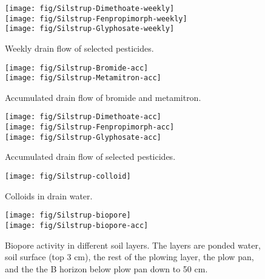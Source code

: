 \begin{figure}[htbp]
  \begin{center}
    \texttt{[image: fig/Silstrup-Dimethoate-weekly]}\\
    \texttt{[image: fig/Silstrup-Fenpropimorph-weekly]}\\
    \texttt{[image: fig/Silstrup-Glyphosate-weekly]}
  \end{center}
  \caption{Weekly drain flow of selected pesticides.}
  \label{fig:Silstrup-weekly2}
\end{figure}\FloatBarrier

\begin{figure}[htbp]
  \begin{center}
    \texttt{[image: fig/Silstrup-Bromide-acc]}\\
    \texttt{[image: fig/Silstrup-Metamitron-acc]}
  \end{center}
  \caption{Accumulated drain flow of bromide and metamitron.}
  \label{fig:Silstrup-bromide-acc}
\end{figure}\FloatBarrier

\begin{figure}[htbp]
  \begin{center}
    \texttt{[image: fig/Silstrup-Dimethoate-acc]}\\
    \texttt{[image: fig/Silstrup-Fenpropimorph-acc]}\\
    \texttt{[image: fig/Silstrup-Glyphosate-acc]}
  \end{center}
  \caption{Accumulated drain flow of selected pesticides.}
  \label{fig:Silstrup-acc}
\end{figure}\FloatBarrier

\begin{figure}[htbp]
  \begin{center}
    \texttt{[image: fig/Silstrup-colloid]}
  \end{center}
  \caption{Colloids in drain water.}
  \label{fig:Silstrup-colloids}
\end{figure}\FloatBarrier

\begin{figure}[htbp]
  \begin{center}
    \texttt{[image: fig/Silstrup-biopore]}\\
    \texttt{[image: fig/Silstrup-biopore-acc]}\\
  \end{center}
  \caption{Biopore activity in different soil layers.  The layers are
    ponded water, soil surface (top 3 cm), the rest of the plowing layer,
    the plow pan, and the the B horizon below plow pan down to 50 cm.}
  \label{fig:Silstrup-biopore}
\end{figure}\FloatBarrier

